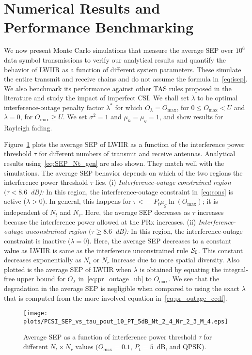 \documentclass[12pt,draftcls,peerreview,onecolumn]{IEEEtran}
\newcommand{\lam}{\lambda}
\newcommand{\lamstar}{\lam^{*}}
\newcommand{\mug}{{\mu_{g}}}
\newcommand{\muh}{{\mu_{h}}}
\newcommand{\Nt}{{N_t}}
\newcommand{\Nr}{{N_r}}
\newcommand{\Pt}{{P_t}}
\newcommand{\noisevar}{\sigma^2}
\newcommand{\outmax}{O_{\text{max}}}
\newcommand{\itau}{\tau}
\newcommand{\out}{O}
\newcommand{\un}{U}
\newcommand{\caluncons}{{\cal S_{\text{0}}}}
\newcommand{\outlam}{\out_{\lam}}
\begin{document}
\section{Numerical Results and Performance Benchmarking}
\label{sec:results}
We now present Monte Carlo simulations that measure the average SEP over  $10^6$ data symbol transmissions to verify our analytical results and quantify the behavior of LWIIR as a function of different system parameters. These simulate the entire transmit and receive chains and do not assume the formula in~\eqref{eq:isep}. We also benchmark its performance against other TAS rules proposed in the literature and study the impact of imperfect CSI. We shall set $\lam$ to be optimal interference-outage penalty factor $\lamstar$ for which $\outlam= \outmax$, for $0 \leq \outmax < \un$ and $\lam=0$,  for $\outmax \geq \un$. We set $\noisevar =1$ and $\muh =\mug = 1$, and show results for Rayleigh fading. 

Figure~\ref{fig:SEP_vs_tau} plots the average SEP of LWIIR as a function of the interference power threshold $\itau$ for different numbers of transmit and receive antennas. Analytical results using~\eqref{eq:SEP_Nt_gen} are also shown. They match well with the simulations. The average SEP behavior depends on which of the two regions the interference power threshold $\itau$ lies. (i) {\em Interference-outage constrained region $(\itau < 8.6$~dB):} In this region, the interference-outage constraint in~\eqref{eq:cons} is active ($\lam>0$). In general, this happens for $\itau\!<\!-\Pt\mug\ln\left(\outmax\right)$; it is independent of $\Nt$ and $\Nr$. Here, the average SEP decreases as $\itau$ increases because the interference power allowed at the PRx increases. (ii) {\em Interference-outage unconstrained region $(\itau \geq 8.6$~dB):} In this region, the interference-outage constraint is inactive ($\lam=0$). Here, the average SEP decreases to a constant value as LWIIR is same as the interference unconstrained rule $\caluncons$. This constant decreases exponentially as $\Nt$ or $\Nr$ increase due to more spatial diversity. Also plotted is the average SEP of LWIIR when $\lam$ is obtained by equating the integral-free upper bound for $\outlam$ in~\eqref{eq:pr_outage_ub} to $\outmax$. We see that the degradation in the average SEP  is negligible when compared to using the exact $\lam$ that is computed from the more involved equation in~\eqref{eq:pr_outage_ccdf}. 

\begin{figure}
  \centering \texttt{[image: plots/PCSI\_SEP\_vs\_tau\_pout\_10\_PT\_5dB\_Nt\_2\_4\_Nr\_2\_3\_M\_4.eps]}
  \caption{Average SEP as a function of interference power threshold $\itau$ for different $\Nt \times \Nr$ values ($\outmax=0.1$,  $\Pt = 5$~dB, and QPSK).}
\label{fig:SEP_vs_tau}
\end{figure}
\end{document}
